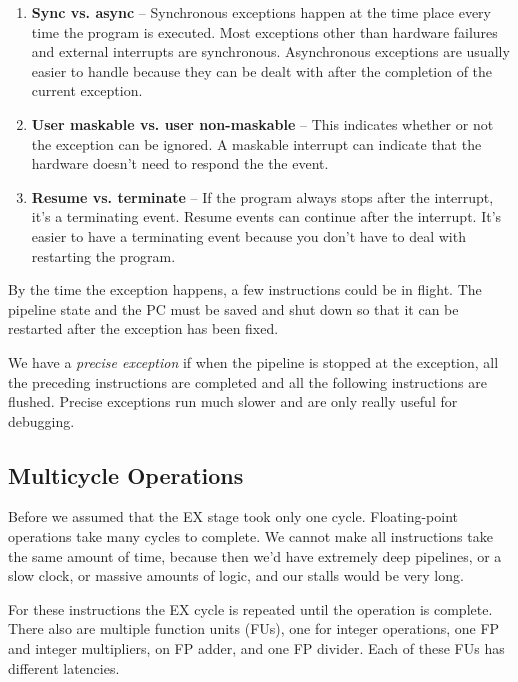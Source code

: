 \documentclass{article}
\begin{document}
\begin{enumerate}
\item \textbf{Sync vs. async} -- Synchronous exceptions happen at the time place every time the program is executed. Most exceptions other than hardware failures and external interrupts are synchronous. Asynchronous exceptions are usually easier to handle because they can be dealt with after the completion of the current exception.


\item \textbf{User maskable vs. user non-maskable} -- This indicates whether or not the exception can be ignored. A maskable interrupt can indicate that the hardware doesn't need to respond the the event. 

\item \textbf{Resume vs. terminate} -- If the program always stops after the interrupt, it's a terminating event. Resume events can continue after the interrupt. It's easier to have a terminating event because you don't have to deal with restarting the program.

\end{enumerate}

By the time the exception happens, a few instructions could be in flight. The pipeline state and the PC must be saved and shut down so that it can be restarted after the exception has been fixed.

We have a \textit{precise exception} if when the pipeline is stopped at the exception, all the preceding instructions are completed and all the following instructions are flushed. Precise exceptions run much slower and are only really useful for debugging.

\subsection{Multicycle Operations}

Before we assumed that the EX stage took only one cycle. Floating-point operations take many cycles to complete. We cannot make all instructions take the same amount of time, because then we'd have extremely deep pipelines, or a slow clock, or massive amounts of logic, and our stalls would be very long.

For these instructions the EX cycle is repeated until the operation is complete. There also are multiple function units (FUs), one for integer operations, one FP and integer multipliers, on FP adder, and one FP divider. Each of these FUs has different latencies.
\end{document}

